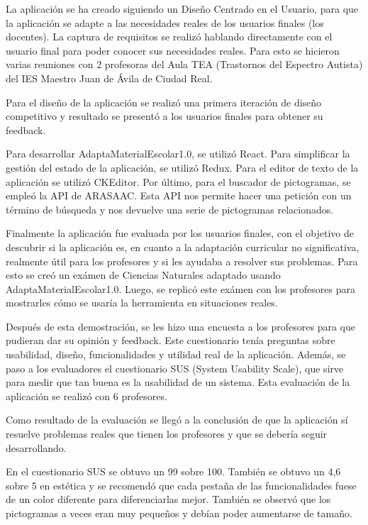 La aplicación se ha creado siguiendo un Diseño Centrado en el Usuario, para que la aplicación se adapte a las necesidades reales de los usuarios finales (los docentes). La captura de requisitos se realizó hablando directamente con el usuario final para poder conocer sus necesidades reales. Para esto se hicieron varias reuniones con 2 profesoras del Aula TEA (Trastornos del Espectro Autista) del IES Maestro Juan de Ávila de Ciudad Real.

Para el diseño de la aplicación se realizó una primera iteración de diseño competitivo y resultado se presentó a los usuarios finales para obtener su feedback.

Para desarrollar AdaptaMaterialEscolar1.0, se utilizó React. Para simplificar la gestión del estado de la aplicación, se utilizó Redux. Para el editor de texto de la aplicación se utilizó CKEditor. Por último, para el buscador de pictogramas, se empleó la API de ARASAAC. Esta API nos permite hacer una petición con un término de búsqueda y nos devuelve una serie de pictogramas relacionados.

Finalmente la aplicación fue evaluada por los usuarios finales, con el objetivo de descubrir si la aplicación es, en cuanto a la adaptación curricular no significativa, realmente útil para los profesores y si les ayudaba a resolver sus problemas. Para esto se creó un exámen de Ciencias Naturales adaptado usando AdaptaMaterialEscolar1.0. Luego, se replicó este exámen con los profesores para mostrarles cómo se usaría la herramienta en situaciones reales.

Después de esta demostración, se les hizo una encuesta a los profesores para que pudieran dar su opinión y feedback. Este cuestionario tenía preguntas sobre usabilidad, diseño, funcionalidades y utilidad real de la aplicación. Además, se paso a los evaluadores el cuestionario SUS (System Usability Scale), que sirve para medir que tan buena es la usabilidad de un sistema. Esta evaluación de la aplicación se realizó con 6 profesores.

Como resultado de la evaluación se llegó a la conclusión de que la aplicación sí resuelve problemas reales que tienen los profesores y que se debería seguir desarrollando.

En el cuestionario SUS se obtuvo un 99 sobre 100. También se obtuvo un 4,6 sobre 5 en estética y se recomendó que cada pestaña de las funcionalidades fuese de un color diferente para diferenciarlas mejor. También se observó que los pictogramas a veces eran muy pequeños y debían poder aumentarse de tamaño.

